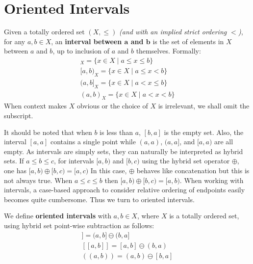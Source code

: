 \newpage


%
%

\section{Oriented Intervals}

\begin{definition}
	Given a totally ordered set $(X, \leq)$ \emph{(and with an implied strict ordering $<$)}, 
	for any $a,b \in X$, an \textbf{interval between $\boldsymbol{a}$ and $\boldsymbol{b}$} 
	is the set of elements in $X$ between $a$ and $b$, up to inclusion of $a$ and $b$ themselves. 
	Formally:
	\begin{align}
		[a,b]_X = \{ x \in X \;|\; a \leq x \leq b \} \\
		[a,b)_X = \{ x \in X \;|\; a \leq x < b \} \\
		(a,b]_X = \{ x \in X \;|\; a < x \leq b \} \\
		(a,b)_X = \{ x \in X \;|\; a < x < b \}
	\end{align}
	When context makes $X$ obvious or the choice of $X$ is irrelevant, we shall omit the subscript.
\end{definition}

It should be noted that when $b$ is less than $a$, $[b,a]$ is the empty set. 
Also, the interval $[a,a]$ contains a single point while $(a,a)$, $(a,a]$, and $[a,a)$ are all empty.
As intervals are simply sets, they can naturally be interpreted as hybrid sets.
If $a \leq b \leq c$, for intervals $[a,b)$ and $[b,c)$ using the hybrid set operator $\oplus$, one has
$[a,b) \oplus [b,c) = [a,c)$
In this case, $\oplus$ behaves like concatenation but this is not always true.
When $a \leq c \leq b$ then $[a,b) \oplus [b,c) = [a,b)$.
When working with intervals, a case-based approach to consider relative ordering of endpoints easily becomes quite cumbersome.
Thus we turn to oriented intervals.

\begin{definition}
	We define \textbf{oriented intervals} with $a,b\in X$, where $X$ is a totally ordered set, 
	using hybrid set point-wise subtraction as follows:
	\begin{align}
		[\![ a,b )\!) = [a,b) \ominus [b,a) \\
		(\!( a,b ]\!] = (a,b] \ominus (b,a] \\
		[\![ a,b ]\!] = [a,b] \ominus (b,a) \\
		(\!( a,b )\!) = (a,b) \ominus [b,a]
	\end{align}
\end{definition}

